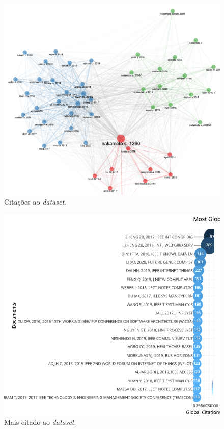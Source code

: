 \begin{figure}
    \centering
    \includegraphics[angle=0,width=1\textwidth]{experiments/Jaxiii/PesquisaBibliometrica/Blockchains/citations.png}
    \caption{Citações ao \textit{dataset}.}
    \label{fig:evol:anual:citacoes:blockchain@Jaxiii}
\end{figure}

\begin{figure}
    \centering
    \includegraphics[angle=0,width=1\textwidth]{experiments/Jaxiii/PesquisaBibliometrica/Blockchains/most-cite.png}
    \caption{Mais citado ao \textit{dataset}.}
    \label{fig:evol:anual:citacoes:blockchain@Jaxiii}
\end{figure}


